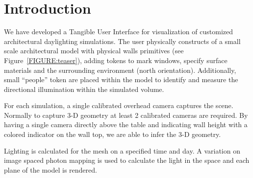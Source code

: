 \documentclass[10pt,twocolumn,letterpaper]{article}
\begin{document}
\section{Introduction}





We have developed a Tangible User Interface for visualization of
customized architectural daylighting simulations.  The user physically
constructs of a small scale architectural model with physical walls
primitives (see Figure~\ref{FIGURE:teaser}), adding tokens to mark
windows, specify surface materials and the surrounding environment
(north orientation).  
%
Additionally, small ``people'' token are placed within the model to
identify and measure the directional illumination within the simulated
volume.


For each simulation, a single calibrated overhead camera captures the
scene.  Normally to capture 3-D geometry at least 2 calibrated cameras
are required. By having a single camera directly above the table and
indicating wall height with a colored indicator on the wall top, we
are able to infer the 3-D geometry.  

Lighting is calculated for the mesh on a specified time and day.  A
variation on image spaced photon mapping \cite{mcguire09imagespace} is used to
calculate the light in the space and each plane of the model is
rendered.
\end{document}
